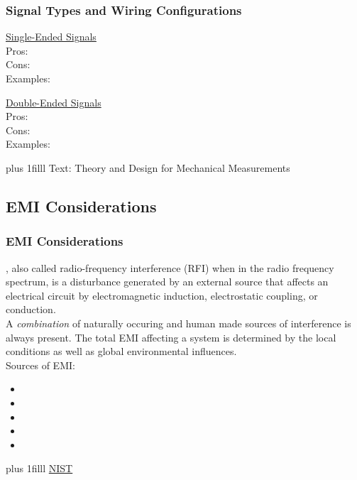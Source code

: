 \documentclass[fleqn]{beamer} %
\newcommand{\sectionIIsubsectionItitle}{Signal Types and Wiring Configurations}
\newcommand{\sectionIIsubsectionIItitle}{EMI Considerations}
\newcommand{\btVFill}{\vskip0pt plus 1filll}
\begin{document}
			 \begin{frame}[label=sectionIIsubsectionI]
				\frametitle{\sectionIIsubsectionItitle} \scriptsize

				\begin{multicols}{2}
					\underline{Single-Ended Signals} \vspace{10mm}\\
					
					Pros:\vspace{10mm}\\
					Cons:\vspace{10mm}\\
					Examples:
					
					\underline{Double-Ended Signals} \vspace{10mm}\\
					
					Pros:\vspace{10mm}\\
					Cons:\vspace{10mm}\\
					Examples:
					
					
				\end{multicols}
				\btVFill
				\tiny{Text: Theory and Design for Mechanical Measurements}
			\end{frame}


		\subsection{\sectionIIsubsectionIItitle}\label{sectionIIsubsectionII}

			\begin{frame}
				\frametitle{\sectionIIsubsectionIItitle} \scriptsize
				\bigskip

				\underline{\hspace{20mm}}, also called radio-frequency interference (RFI) when in the radio frequency spectrum, is a disturbance generated by an external source that affects an electrical circuit by electromagnetic induction, electrostatic coupling, or conduction. \vspace{5mm}\\


				A {\it combination} of naturally occuring and human made sources of interference is always present. The total EMI affecting a system is determined by the local conditions as well as global environmental influences. \vspace{5mm}\\


				Sources of EMI:
				\begin{itemize}

					\item 
					\item  
					\item 
					\item 
					\item 

				\end{itemize}


				\btVFill
				\tiny{\href{https://csrc.nist.gov/glossary/term/electromagnetic_interference}{NIST}}		
			\end{frame}
\end{document}
